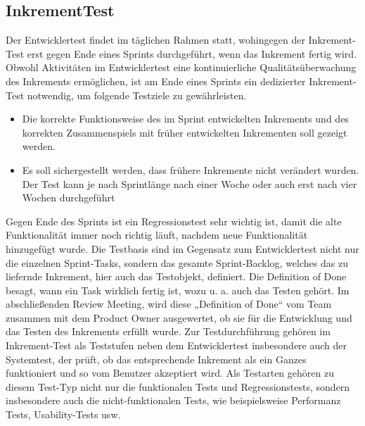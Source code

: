\subsection{InkrementTest}
\label{sub:InkremenTest}

Der Entwicklertest findet im täglichen Rahmen statt, wohingegen der Inkrement-Test erst gegen Ende eines Sprints durchgeführt, wenn das Inkrement fertig wird. Obwohl Aktivitäten im Entwicklertest eine kontinuierliche Qualitätsüberwachung des Inkrements ermöglichen, ist am Ende eines Sprints ein dedizierter Inkrement-Test notwendig, um folgende Testziele zu gewährleisten.

\begin{itemize}
    \item Die korrekte Funktionsweise des im Sprint entwickelten Inkrements und des korrekten Zusammenspiels mit früher entwickelten Inkrementen soll gezeigt werden.
    \item Es soll sichergestellt werden, dass frühere Inkremente nicht verändert wurden. Der Test kann je nach Sprintlänge nach einer Woche oder auch erst nach vier Wochen durchgeführt
\end{itemize}

Gegen Ende des Sprints ist ein Regressionstest sehr wichtig ist, damit die alte Funktionalität immer noch richtig läuft, nachdem neue Funktionalität hinzugefügt wurde.
Die Testbasis sind im Gegensatz zum Entwicklertest nicht nur die einzelnen Sprint-Tasks, sondern das gesamte Sprint-Backlog, welches das zu liefernde Inkrement, hier auch das Testobjekt, definiert. Die Definition of Done besagt, wann ein Task wirklich fertig ist, wozu u. a. auch das Testen gehört. Im abschließenden Review Meeting, wird diese „Definition of Done“ vom Team zusammen mit dem Product Owner ausgewertet, ob sie für die Entwicklung und das Testen des Inkrements erfüllt wurde. Zur Testdurchführung gehören im Inkrement-Test als Teststufen neben dem Entwicklertest insbesondere auch der Systemtest, der prüft, ob das entsprechende Inkrement als ein Ganzes funktioniert und so vom Benutzer akzeptiert wird. Als Testarten gehören zu diesem Test-Typ nicht nur die funktionalen Tests und Regressionstests, sondern insbesondere auch die nicht-funktionalen Tests, wie beispielsweise Performanz Tests, Usability-Tests usw.

